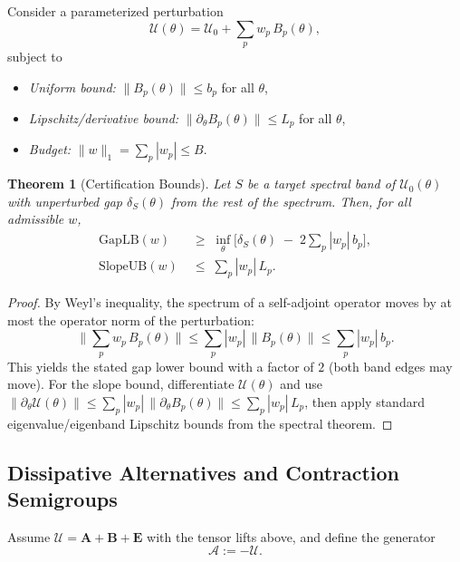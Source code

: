 \documentclass[10pt]{article}
\newtheorem{theorem}{Theorem}
\begin{document}
Consider a parameterized perturbation
\[
\mathcal U(\theta)=\mathcal U_0+\sum_{p} w_p\, B_p(\theta),
\]
subject to
\begin{itemize}
    \item \emph{Uniform bound:} $\|B_p(\theta)\|\le b_p$ for all $\theta$,
    \item \emph{Lipschitz/derivative bound:} $\|\partial_\theta B_p(\theta)\|\le L_p$ for all $\theta$,
    \item \emph{Budget:} $\|w\|_1=\sum_p |w_p|\le B$.
\end{itemize}

\begin{theorem}[Certification Bounds]
Let $S$ be a target spectral band of $\mathcal U_0(\theta)$ with unperturbed gap $\delta_S(\theta)$ from the rest of the spectrum. Then, for all admissible $w$,
\begin{align*}
\mathrm{GapLB}(w) &\;\ge\; \inf_{\theta}\Big[\delta_S(\theta)\;-\;2\sum_{p}|w_p|\,b_p\Big],\\
\mathrm{SlopeUB}(w) &\;\le\; \sum_{p}|w_p|\,L_p.
\end{align*}
\end{theorem}

\begin{proof}
By Weyl's inequality, the spectrum of a self-adjoint operator moves by at most the operator norm of the perturbation:
\[
\Big\|\sum_{p} w_p\,B_p(\theta)\Big\| \le \sum_{p}|w_p|\,\|B_p(\theta)\|\le \sum_{p}|w_p|\,b_p.
\]
This yields the stated gap lower bound with a factor of $2$ (both band edges may move). For the slope bound, differentiate $\mathcal U(\theta)$ and use $\|\partial_\theta \mathcal U(\theta)\|\le \sum_p |w_p|\,\|\partial_\theta B_p(\theta)\|\le \sum_p |w_p|\,L_p$, then apply standard eigenvalue/eigenband Lipschitz bounds from the spectral theorem.
\end{proof}


\subsection{Dissipative Alternatives and Contraction Semigroups}\label{sec:dissipative}

Assume $\mathcal U=\mathbf A+\mathbf B+\mathbf E$ with the tensor lifts above, and define the generator
\[
\mathcal A:=-\mathcal U.
\]
\end{document}
